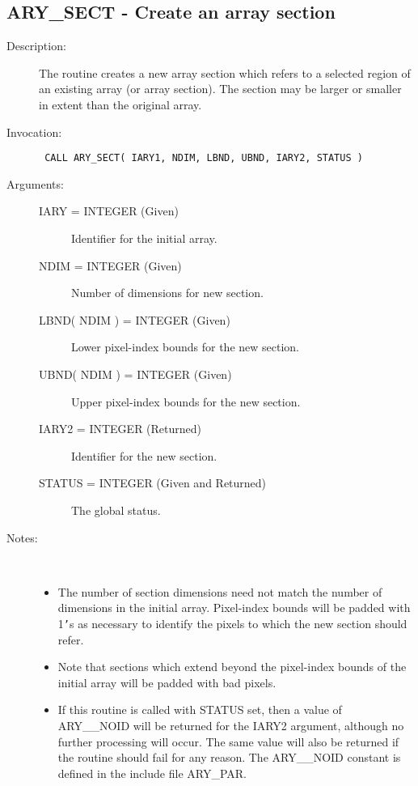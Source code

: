 \documentclass[twoside,11pt]{article}
\newcommand{\xlabel}[1]{}
\newlength{\sstbannerlength}
\newlength{\sstcaptionlength}
\newlength{\sstexampleslength}
\newlength{\sstexampleswidth}
\newcommand{\sstroutine}[3]{
   \goodbreak
   \rule{\textwidth}{0.5mm}
   \vspace{-7ex}
   \newline
   \settowidth{\sstbannerlength}{{\Large {\bf #1}}}
   \setlength{\sstcaptionlength}{\textwidth}
   \setlength{\sstexampleslength}{\textwidth}
   \addtolength{\sstbannerlength}{0.5em}
   \addtolength{\sstcaptionlength}{-2.0\sstbannerlength}
   \addtolength{\sstcaptionlength}{-5.0pt}
   \settowidth{\sstexampleswidth}{{\bf Examples:}}
   \addtolength{\sstexampleslength}{-\sstexampleswidth}
   \parbox[t]{\sstbannerlength}{\flushleft{\Large {\bf #1}}}
   \parbox[t]{\sstcaptionlength}{\center{\Large #2}}
   \parbox[t]{\sstbannerlength}{\flushright{\Large {\bf #1}}}
   \begin{description}
      #3
   \end{description}
}
\newcommand{\sstdescription}[1]{\item[Description:] #1}
\newcommand{\sstinvocation}[1]{\item[Invocation:]\hspace{0.4em}{\tt #1}}
\newcommand{\sstarguments}[1]{
   \item[Arguments:] \mbox{} \\
   \vspace{-3.5ex}
   \begin{description}
      #1
   \end{description}
}
\newcommand{\sstsubsection}[1]{ \item[{#1}] \mbox{} \\}
\newcommand{\sstnotes}[1]{\item[Notes:] \mbox{} \\[1.3ex] #1}
\newcommand{\sstitemlist}[1]{
  \mbox{} \\
  \vspace{-3.5ex}
  \begin{itemize}
     #1
  \end{itemize}
}
\newcommand{\sstitem}{\item}
\newcommand{\ssttt}{\tt}
\renewcommand{\sstroutine}[3]{
      \subsection{#1\xlabel{#1}-\label{#1}#2}
      \begin{description}
         #3
      \end{description}
   }
\renewcommand{\sstdescription}[1]{\item[Description:]
      \begin{description}
         #1
      \end{description}
   }
\renewcommand{\sstinvocation}[1]{\item[Invocation:]
      \begin{description}
         {\ssttt #1}
      \end{description}
   }
\renewcommand{\sstarguments}[1]{
      \item[Arguments:]
      \begin{description}
         #1
      \end{description}
   }
\renewcommand{\sstsubsection}[1]{\item[{#1}]}
\renewcommand{\sstnotes}[1]{\item[Notes:]
      \begin{description}
         #1
      \end{description}
   }
\newcommand{\sstitemlist}[1]{
      \begin{itemize}
         #1
      \end{itemize}
   }
\begin{document}
\sstroutine{
   ARY\_SECT
}{
   Create an array section
}{
   \sstdescription{
      The routine creates a new array section which refers to a
      selected region of an existing array (or array section). The
      section may be larger or smaller in extent than the original
      array.
   }
   \sstinvocation{
      CALL ARY\_SECT( IARY1, NDIM, LBND, UBND, IARY2, STATUS )
   }
   \sstarguments{
      \sstsubsection{
         IARY = INTEGER (Given)
      }{
         Identifier for the initial array.
      }
      \sstsubsection{
         NDIM = INTEGER (Given)
      }{
         Number of dimensions for new section.
      }
      \sstsubsection{
         LBND( NDIM ) = INTEGER (Given)
      }{
         Lower pixel-index bounds for the new section.
      }
      \sstsubsection{
         UBND( NDIM ) = INTEGER (Given)
      }{
         Upper pixel-index bounds for the new section.
      }
      \sstsubsection{
         IARY2 = INTEGER (Returned)
      }{
         Identifier for the new section.
      }
      \sstsubsection{
         STATUS = INTEGER (Given and Returned)
      }{
         The global status.
      }
   }
   \sstnotes{
      \sstitemlist{

         \sstitem
         The number of section dimensions need not match the number of
         dimensions in the initial array. Pixel-index bounds will be
         padded with 1{\tt '}s as necessary to identify the pixels to which the
         new section should refer.

         \sstitem
         Note that sections which extend beyond the pixel-index bounds
         of the initial array will be padded with bad pixels.

         \sstitem
         If this routine is called with STATUS set, then a value of
         ARY\_\_NOID will be returned for the IARY2 argument, although no
         further processing will occur. The same value will also be
         returned if the routine should fail for any reason. The ARY\_\_NOID
         constant is defined in the include file ARY\_PAR.
      }
   }
}
\end{document}
